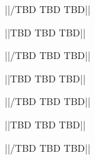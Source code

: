 ||/TBD TBD TBD||

\tertiaryEnd{}


||TBD TBD TBD||

||/TBD TBD TBD||

\tertiaryEnd{}


||TBD TBD TBD||

||/TBD TBD TBD||

\tertiaryEnd{}


||TBD TBD TBD||

||/TBD TBD TBD||

\tertiaryEnd{}

\secondaryEnd{}

\primaryEnd{}
